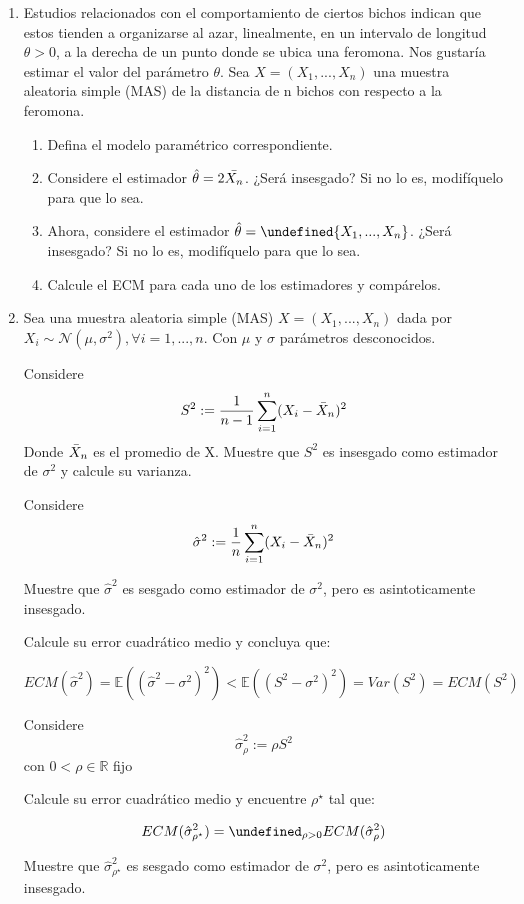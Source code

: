 \documentclass[11pt]{article}
\let\max=\undefined\DeclareMathOperator*{\max}{\text{máx}}
\let\inf=\undefined\DeclareMathOperator*{\inf}{\text{ínf}}
\begin{document}
\begin{enumerate}\setlength{\itemsep}{0.4cm}

\item Estudios relacionados con el comportamiento de ciertos bichos indican que estos tienden a organizarse al azar, linealmente, en un intervalo de longitud $\theta > 0$, a la derecha de un punto donde se ubica una feromona. Nos gustaría estimar el valor del parámetro $\theta$. Sea $X=(X_1,...,X_n)$ una muestra aleatoria simple (MAS) de la distancia de n bichos con respecto a la feromona.

\begin{enumerate}
    \item Defina el modelo paramétrico correspondiente.
    \item Considere el estimador $\hat{\theta}=2\Bar{X_n}$. ¿Será insesgado? Si no lo es, modifíquelo para que lo sea.
    \item Ahora, considere el estimador $\hat{\theta}=\max\{ X_1,...,X_n\}$. ¿Será insesgado? Si no lo es, modifíquelo para que lo sea.
    \item Calcule el ECM para cada uno de los estimadores y compárelos.
\end{enumerate}

\item Sea una muestra aleatoria simple (MAS) $X=(X_1,...,X_n)$ dada por $X_i\sim\mathcal{N}(\mu,\sigma^2),\forall i=1,...,n$. Con $\mu$ y $\sigma$ parámetros desconocidos.

Considere
\[ S^2:= \frac{1}{n-1}\sum\limits_{i=1}^{n}(X_i-\Bar{X}_n)^2 \]
Donde $\Bar{X}_n$ es el promedio de X. Muestre que $S^2$ es insesgado como estimador de $\sigma^2$ y calcule su varianza.

Considere
\[ \hat{\sigma}^2:= \frac{1}{n}\sum\limits_{i=1}^{n}(X_i-\Bar{X}_n)^2 \]

Muestre que $\hat{\sigma}^2$ es sesgado como estimador de $\sigma^2$, pero es asintoticamente insesgado.

Calcule su error cuadrático medio y concluya que:

\[ECM(\hat{\sigma}^2)=\mathbb{E}((\hat{\sigma}^2-\sigma^2)^2)<\mathbb{E}((S^2-\sigma^2)^2)=Var(S^2)=ECM(S^2)\]

Considere
\[\hat{\sigma}^2_\rho:=\rho S^2   \]
con $0<\rho \in \mathbb{R}$ fijo

Calcule su error cuadrático medio y encuentre $\rho^\star$ tal que:

\[ ECM(\hat{\sigma}^2_{\rho^\star})=\inf_{\rho>0} ECM(\hat{\sigma}^2_\rho)\]

Muestre que $\hat{\sigma}^2_{\rho^\star}$ es sesgado como estimador de $\sigma^2$, pero es asintoticamente insesgado.




\end{enumerate}
\end{document}
